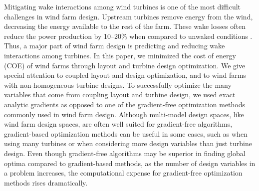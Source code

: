 \documentclass[wes, manuscript]{copernicus}
\providecommand{\DIFdelbegin}{} %
\providecommand{\DIFdelend}{} %
\begin{document}
\DIFdelbegin %
\DIFdelend %


\introduction  %

Mitigating wake interactions among wind turbines is one of the most difficult challenges in wind farm design. Upstream turbines remove energy from the wind, decreasing the energy available to the rest of the farm. These wake losses often reduce the power production by 10--20\% when compared to unwaked conditions \citep{barthelmie2007modelling,barthelmie2009modelling,briggs2013navigating}. 
Thus, a major part of wind farm design is predicting and reducing wake interactions among turbines. 
In this paper, we minimized the cost of energy (COE) of wind farms through layout and turbine design optimization. We give special attention to coupled layout and design optimization, and to wind farms with non-homogeneous turbine designs.
To successfully optimize the many variables that come from coupling layout and turbine design, we used exact analytic gradients as opposed to one of the gradient-free optimization methods commonly used in wind farm design.
Although multi-model design spaces, like wind farm design spaces, are often well suited for gradient-free algorithms, gradient-based optimization methods can be useful in some cases, such as when using many turbines or when considering more design variables than just turbine design. Even though gradient-free algorithms may be superior in finding global optima compared to gradient-based methods, as the number of design variables in a problem increases, the computational expense for gradient-free optimization methods rises dramatically. 
\end{document}
